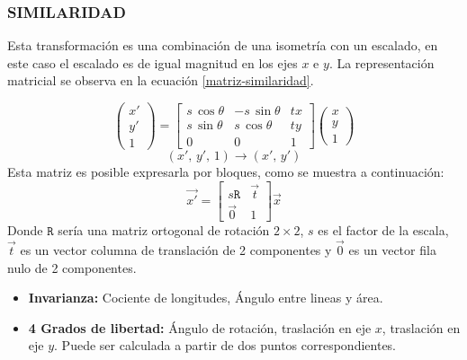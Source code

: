 \subsubsection*{SIMILARIDAD}

Esta transformación es una combinación de una isometría con un escalado, en este caso el escalado es de igual magnitud en los ejes $x$ e $y$. La representación matricial se observa en la ecuación \ref{matriz-similaridad}.

\begin{equation}
\begin{pmatrix}
{x'}\\{y'}\\{1}
\end{pmatrix} = 
\begin{bmatrix}
{s\, \cos \theta}&{-s\, \sin \theta}&{tx}\\
{s\, \sin \theta}&{s\, \cos \theta}&{ty}\\
{0}&{0}&{1}
\end{bmatrix}
\begin{pmatrix}
{x}\\{y}\\{1}
\end{pmatrix}
\label{matriz-similaridad}
\end{equation}
\begin{displaymath}
(x', \,y', \,1) \to (x',\, y')
\end{displaymath}
Esta matriz es posible expresarla por bloques, como se muestra a continuación:
\begin{displaymath}
\vec{x'}= 
\begin{bmatrix}
{s\mathtt{R}}&{\vec{t}}\\
{\vec{0}}&{1}
\end{bmatrix}
\vec{x}
\label{bloque-similaridad}
\end{displaymath}
Donde $ \mathtt{R} $ sería una matriz ortogonal de rotación $2\times2$, $s$ es el factor de la escala, $ \vec{t} $ es un vector columna de translación de 2 componentes y $\vec{0} $ es un vector fila nulo de 2 componentes.

\begin{itemize}
	\item \textbf{Invarianza:} Cociente de longitudes, Ángulo entre lineas y área.
	\item \textbf{4 Grados de libertad:} Ángulo de rotación, traslación en eje $x$, traslación en eje $y$. Puede ser calculada a partir de dos puntos correspondientes.
\end{itemize}


